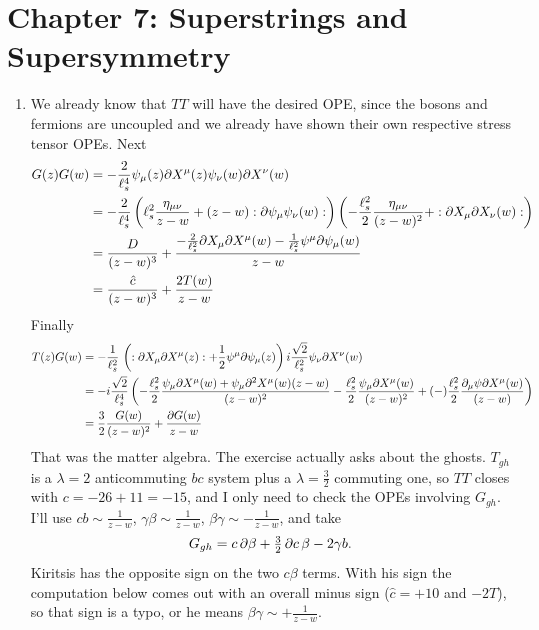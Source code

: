 \documentclass[11pt, class=article, crop=false]{standalone}
\begin{document}
\section*{Chapter 7: Superstrings and Supersymmetry} %
\label{sec:chapter_7_superstrings_and_supersymmetry}
\begin{enumerate}
	\item We already know that $T T$ will have the desired OPE, since the bosons and fermions are uncoupled and we already have shown their own respective stress tensor OPEs. Next
	\[
	\begin{aligned}
		G(z) G(w) &= - \frac{2}{\ell_s^4} \psi_\mu(z) \partial X^\mu(z) \psi_\nu(w) \partial X^\nu (w)\\ 
		&= - \frac{2}{\ell_s^4} \left(\ell_s^2 \frac{\eta_{\mu \nu}}{z-w} + (z-w) :\partial \psi_\mu \psi_\nu(w): \right) \left(-\frac{\ell_s^2}{2} \frac{\eta_{\mu \nu}}{(z-w)^2} + :\partial X_\mu \partial X_\nu (w): \right)\\
		&= \frac{D}{(z-w)^3} + \frac{-\frac{2}{\ell_s^2} \partial X_\mu \partial X^\mu (w) - \frac{1}{\ell_s^2} \psi^\mu \partial \psi_\mu (w)}{z-w} \\
		&= \frac{\hat c}{(z-w)^3} + \frac{2 T(w)}{z-w}
	\end{aligned}
	\]
	Finally
	\[
		\begin{aligned}
			T(z) G(w) &= - \frac{1}{\ell_s^2} \, \left(:\partial X_\mu \partial X^\mu (z): + \frac12 \psi^\mu \partial \psi_\mu (z)\right) i \frac{\sqrt 2}{\ell_s^2} \psi_\nu \partial X^\nu(w)\\
			&= -i \frac{\sqrt 2}{\ell_s^4} \left(-\frac{\ell_s^2}{2} \frac{ \psi_\mu \partial X^\mu (w) + \psi_\mu \partial^2 X^\mu(w) (z-w)}{(z-w)^2} - \frac{\ell_s^2}{2} \frac{ \psi_\mu \partial X^\mu (w)}{(z-w)^2} + (-) \frac{\ell_s^2}{2} \frac{\partial_\mu \psi \partial X^\mu(w)}{(z-w)} \right)\\
			&= \frac32 \frac{G(w)}{(z-w)^2} + \frac{\partial G(w)}{z-w}
		\end{aligned}
	\]
	That was the matter algebra. The exercise actually asks about the ghosts. $T_{gh}$ is a $\lambda = 2$ anticommuting $bc$ system plus a $\lambda = \frac32$ commuting one, so $TT$ closes with $c = -26 + 11 = -15$, and I only need to check the OPEs involving $G_{gh}$. I'll use $c b \sim \frac{1}{z-w}$, $\gamma \beta \sim \frac{1}{z-w}$, $\beta \gamma \sim -\frac{1}{z-w}$, and take
	\[
		G_{gh} = c\, \partial \beta + \tfrac32\, \partial c\, \beta - 2 \gamma b.
	\]
	Kiritsis has the opposite sign on the two $c \beta$ terms. With his sign the computation below comes out with an overall minus sign ($\hat c = +10$ and $-2T$), so that sign is a typo, or he means $\beta \gamma \sim + \frac{1}{z-w}$.
	

\end{enumerate}
\end{document}
